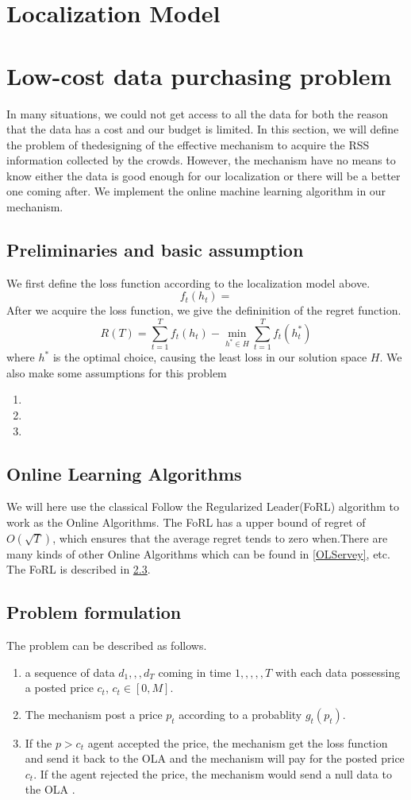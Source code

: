 \documentclass[10pt,conference,compsocconf,letterpaper]{IEEEtran}
\begin{document}
\section{Localization Model}

\section{Low-cost data purchasing problem}
 In many situations, we could not get access to all the data for both the reason that the data has a cost and our budget is limited. In this section, we will define the problem of thedesigning of the effective mechanism to acquire the RSS information collected by the crowds. However, the mechanism have no means to know either the data is good enough for our localization or there will be a better one coming after. We implement the online machine learning algorithm in our mechanism.
\subsection{Preliminaries and basic assumption}
We first define the loss function according to the localization model above.
\[f_t(h_t)=\]
 After we acquire the loss function, we give the defininition of the regret function.
\[R(T)=\sum_{t=1}^Tf_t(h_t)-\min_{h^*\in H}\sum_{t=1}^Tf_t(h^*_t)\]
where $h^*$ is the optimal choice, causing the least loss in our solution space $H$.
We also make some assumptions for this problem
\begin{enumerate}
\item 
\item 
\item 
\end{enumerate}
\subsection{Online Learning Algorithms}
We will here use the classical Follow the Regularized Leader(FoRL) algorithm to work as the Online Algorithms. The FoRL has a upper bound of regret of $O(\sqrt{T})$, which ensures that the average regret tends to zero when.There are many kinds of other Online Algorithms which can be found in \ref{OLServey}, etc. The FoRL is described in \ref{}.
\subsection{Problem formulation}
The problem can be described as follows. 
\begin{enumerate}
\item a sequence of data ${d_1,,,d_T}$ coming in time $1,,,,,T$ with each data possessing a posted price $c_t$, $c_t\in [0,M]$. 
\item The mechanism post a price $p_t$ according to a probablity $g_t(p_t)$. 
\item If the $p>c_t$ agent accepted the price, the mechanism get the loss function and send it back to the OLA and the mechanism will pay for the posted price $c_t$. If the agent rejected the price, the mechanism would send a null data to the OLA . 
\end{enumerate}
\end{document}
